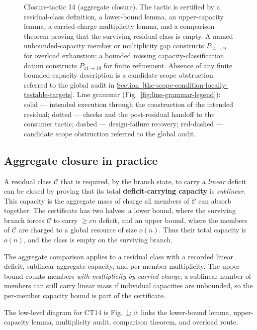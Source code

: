 \documentclass[
  11pt,
]{article}
\theoremstyle{definition}
\newcommand{\secref}[1]{\hyperref[#1]{Section~\ref*{#1}}}
\begin{document}
\begin{figure}[p]
{%
}
\caption[Closure-tactic 14: aggregate closure]{Closure-tactic 14 (aggregate closure).  The tactic is certified by a residual-class definition, a lower-bound lemma, an upper-capacity lemma, a carried-charge multiplicity lemma, and a comparison theorem proving that the surviving residual class is empty.  A named unbounded-capacity member or multiplicity gap constructs \(P_{14\to9}\) for overload exhaustion; a bounded missing capacity-classification datum constructs \(P_{14\to10}\) for finite refinement.  Absence of any finite bounded-capacity description is a candidate scope obstruction referred to the global audit in \secref{the-scope-condition-locally-testable-targets}.  Line grammar (Fig.~\ref{fig:line-grammar-legend}): solid --- intended execution through the construction of the intended residual; dotted --- checks and the post-residual handoff to the consumer tactic; dashed --- design-failure recovery; red-dashed --- candidate scope obstruction referred to the global audit.}
\label{fig:ct14-aggregate-closure}
\end{figure}
\FloatBarrier

\subsection*{Aggregate closure in practice}

A residual class \(\mathcal C\) that is required, by the branch state,
to carry a \emph{linear} deficit can be closed by proving that its total
\textbf{deficit-carrying capacity} is \emph{sublinear}. This capacity is
the aggregate mass of charge all members of \(\mathcal C\) can absorb
together. The certificate has two halves: a lower bound, where the
surviving branch forces \(\mathcal C\) to carry \(\ge cn\) deficit, and
an upper bound, where the members of \(\mathcal C\) are charged to a
global resource of size \(o(n)\). Thus their total capacity is \(o(n)\),
and the class is empty on the surviving branch.

The aggregate comparison applies to a residual class with a recorded
linear deficit, sublinear aggregate capacity, and per-member
multiplicity.  The upper bound counts members \emph{with multiplicity by
carried charge}; a sublinear number of members can still carry linear
mass if individual capacities are unbounded, so the per-member capacity
bound is part of the certificate.

The low-level diagram for CT14 is Fig.~\ref{fig:ct14-aggregate-closure};
it links the lower-bound lemma, upper-capacity lemma, multiplicity audit,
comparison theorem, and overload route.
\end{document}
